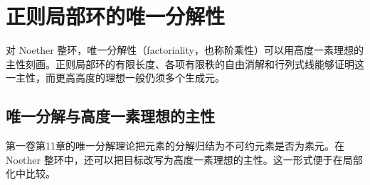 
\section{正则局部环的唯一分解性}
\label{b3:sec:1804}

对 Noether 整环，唯一分解性（factoriality，也称阶乘性）可以用高度一素理想的主性刻画。正则局部环的有限长度、各项有限秩的自由消解和行列式线能够证明这一主性，而更高高度的理想一般仍须多个生成元。

%
%

\subsection{唯一分解与高度一素理想的主性}
\label{b3:subsec:1804:01}

第一卷第11章的唯一分解理论把元素的分解归结为不可约元素是否为素元。在 Noether 整环中，还可以把目标改写为高度一素理想的主性。这一形式便于在局部化中比较。

